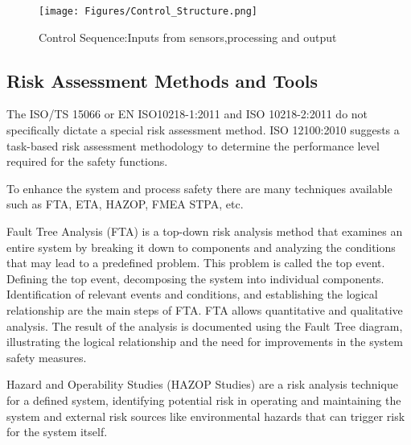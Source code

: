 {%



 \begin{figure}
     \centering
    \begin{minipage}{1.0\linewidth}
     \centering
        \texttt{[image: Figures/Control\_Structure.png]}
        \centering
     \caption{Control Sequence:Inputs from sensors,processing and output}
     \end{minipage}
     \label{fig:enter-label}
 \end{figure}
 

\subsection{\RaggedRight Risk Assessment Methods and Tools }

 The ISO/TS 15066 or EN ISO10218-1:2011 and ISO 10218-2:2011 do not specifically  dictate a special risk assessment method. ISO 12100:2010 suggests a task-based risk assessment methodology to determine the performance level required for the safety functions.
 
 To enhance the system and process safety there are many techniques available such as FTA, ETA, HAZOP, FMEA STPA, etc. 

Fault Tree Analysis (FTA) is a top-down risk analysis method that examines an entire system by breaking it down to components and analyzing the conditions that may lead to a predefined problem. This problem is called the top event. Defining the top event, decomposing the system into individual components. Identification of relevant events and conditions, and establishing the logical relationship are the main steps of FTA. FTA allows quantitative and qualitative analysis. The result of the analysis is documented using the Fault Tree diagram, illustrating the logical relationship and the need for improvements in the system safety measures.

Hazard and Operability Studies (HAZOP Studies) are a risk analysis technique for a defined system, identifying potential risk in operating and maintaining the system and external risk sources like environmental hazards that can trigger risk for the system itself.

}
